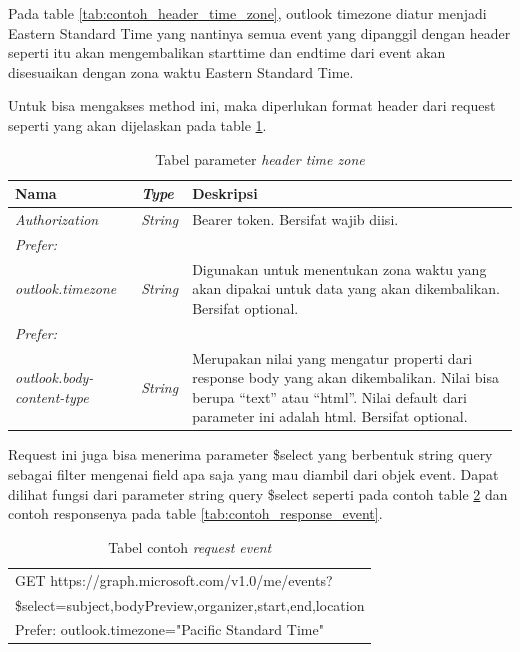 Pada table \ref{tab:contoh_header_time_zone}, outlook timezone diatur menjadi Eastern Standard Time yang nantinya semua event yang dipanggil dengan header seperti itu akan mengembalikan starttime dan endtime dari event akan disesuaikan dengan zona waktu Eastern Standard Time. 

Untuk bisa mengakses method ini, maka diperlukan format header dari request seperti yang akan dijelaskan pada table \ref{tab:parameter_header_time_zone}. 

\begin{table}[H]
	\centering 
	\caption{Tabel parameter \textit{header time zone}}
	\label{tab:parameter_header_time_zone}
	\begin{tabular}{|p{3cm}|p{3cm}|p{9cm}|}
	\toprule
	 \textbf{Nama} & \textbf{\textit{Type}} & \textbf{Deskripsi}\\ \hline
	 \textit{Authorization} & \textit{String} & Bearer {token}. Bersifat wajib diisi. \\ \hline
	 \textit{Prefer:}& & \\
	 \textit{outlook.timezone} & \textit{String} & Digunakan untuk menentukan zona waktu yang akan dipakai untuk data yang akan dikembalikan. Bersifat optional. \\ \hline
	 \textit{Prefer:}& & \\
	 \textit{outlook.body-content-type} & \textit{String} & Merupakan nilai yang mengatur properti dari response body yang akan dikembalikan. Nilai bisa berupa ``text'' atau ``html''. Nilai default dari parameter ini adalah html. Bersifat optional. \\ \hline
	\bottomrule
	\end{tabular}  
\end{table}

Request ini juga bisa menerima parameter \$select yang berbentuk string query sebagai filter mengenai field apa saja yang mau diambil dari objek event. Dapat dilihat fungsi dari parameter string query \$select seperti pada contoh table \ref{tab:contoh_request_event} dan contoh responsenya pada table \ref{tab:contoh_response_event}. 

\begin{table}[H]
	\centering 
	\caption{Tabel contoh \textit{request event}}
	\label{tab:contoh_request_event}
	\begin{tabular}{|p{12cm}|}
	\toprule
	GET https://graph.microsoft.com/v1.0/me/events?\\
	\$select=subject,bodyPreview,organizer,start,end,location\\
	Prefer: outlook.timezone="Pacific Standard Time"\\
	\bottomrule
	\end{tabular}  
\end{table}


